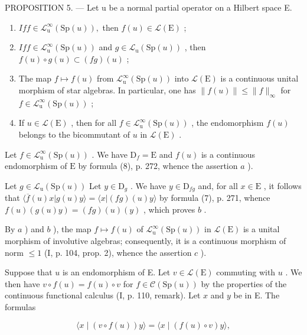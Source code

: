 PROPOSITION 5. --- Let u be a normal partial operator on a Hilbert space E.

\begin{enumerate}
\def\labelenumi{\alph{enumi})}
\item
  \(If f \in \mathcal{L}_{\mathrm{u}}^{\infty}(\mathrm{Sp}(u)),\) then \(f(u) \in \mathcal{L}(\mathrm{E})\) ;
\item
  \(If f \in \mathcal{L}_{\mathrm{u}}^{\infty}(\mathrm{Sp}(u))\) and \(g \in \mathcal{L}_{\mathrm{u}}(\mathrm{Sp}(u))\) , then \(f(u) \circ g(u) \subset (fg)(u)\) ;
\item
  The map \(f \mapsto f(u)\) from \(\mathcal{L}_{\mathrm{u}}^{\infty}(\mathrm{Sp}(u))\) into \(\mathcal{L}(\mathrm{E})\) is a continuous unital morphism of star algebras. In particular, one has \(\|f(u)\|\leqslant\|f\|_{\infty}\) for \(f\in\mathcal{L}_{\mathrm{u}}^{\infty}(\mathrm{Sp}(u))\) ;
\item
  If \(u \in \mathcal{L}(\mathrm{E})\) , then for all \(f \in \mathcal{L}_{\mathrm{u}}^{\infty}(\mathrm{Sp}(u))\) , the endomorphism \(f(u)\) belongs to the bicommutant of \(u\) in \(\mathcal{L}(\mathrm{E})\) .
\end{enumerate}

Let \(f \in \mathcal{L}_{\mathrm{u}}^{\infty}(\mathrm{Sp}(u))\) . We have \(\mathrm{D}_f = \mathrm{E}\) and \(f(u)\) is a continuous endomorphism of \(\mathrm{E}\) by formula (8), p. 272, whence the assertion \(a\) ).

Let \(g \in \mathcal{L}_{\mathrm{u}}(\mathrm{Sp}(u))\) Let \(y \in \mathrm{D}_g\) . We have \(y \in \mathrm{D}_{fg}\) and, for all \(x \in \mathrm{E}\) , it follows that \(\langle \overline{f}(u)x | g(u)y \rangle = \langle x | (fg)(u)y \rangle\) by formula (7), p. 271, whence \(f(u)(g(u)y) = (fg)(u)(y)\) , which proves \(b\) .

By \(a\) ) and \(b\) ), the map \(f \mapsto f(u)\) of \(\mathcal{L}_{\mathrm{u}}^{\infty}(\mathrm{Sp}(u))\) in \(\mathcal{L}(\mathrm{E})\) is a unital morphism of involutive algebras; consequently, it is a continuous morphism of norm \(\leqslant 1\) (I, p. 104, prop. 2), whence the assertion \(c\) ).

Suppose that \(u\) is an endomorphism of E. Let \(v \in \mathcal{L}(\mathrm{E})\) commuting with \(u\) . We then have \(v \circ f(u) = f(u) \circ v\) for \(f \in \mathcal{C}(\mathrm{Sp}(u))\) by the properties of the continuous functional calculus (I, p. 110, remark). Let \(x\) and \(y\) be in E. The formulas

\[
\langle x \mid (v \circ f (u)) y \rangle = \langle x \mid (f (u) \circ v) y \rangle ,\tag{9}
\]


